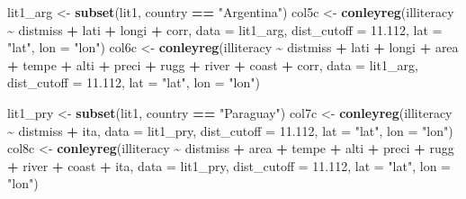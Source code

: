 \documentclass[
  a4paper,
]{article}
\newenvironment{Shaded}{\begin{snugshade}}{\end{snugshade}}
\newcommand{\AttributeTok}[1]{\textcolor[rgb]{0.13,0.29,0.53}{#1}}
\newcommand{\FloatTok}[1]{\textcolor[rgb]{0.00,0.00,0.81}{#1}}
\newcommand{\FunctionTok}[1]{\textcolor[rgb]{0.13,0.29,0.53}{\textbf{#1}}}
\newcommand{\NormalTok}[1]{#1}
\newcommand{\OtherTok}[1]{\textcolor[rgb]{0.56,0.35,0.01}{#1}}
\newcommand{\SpecialCharTok}[1]{\textcolor[rgb]{0.81,0.36,0.00}{\textbf{#1}}}
\newcommand{\StringTok}[1]{\textcolor[rgb]{0.31,0.60,0.02}{#1}}
\begin{document}
\begin{Shaded}
\begin{Highlighting}[]
\NormalTok{lit1\_arg }\OtherTok{\textless{}{-}} \FunctionTok{subset}\NormalTok{(lit1, country }\SpecialCharTok{==} \StringTok{"Argentina"}\NormalTok{)}
\NormalTok{col5c }\OtherTok{\textless{}{-}} \FunctionTok{conleyreg}\NormalTok{(illiteracy }\SpecialCharTok{\textasciitilde{}}\NormalTok{ distmiss }\SpecialCharTok{+}\NormalTok{ lati }\SpecialCharTok{+}\NormalTok{ longi }\SpecialCharTok{+}\NormalTok{ corr, }\AttributeTok{data =}\NormalTok{ lit1\_arg,}
    \AttributeTok{dist\_cutoff =} \FloatTok{11.112}\NormalTok{, }\AttributeTok{lat =} \StringTok{"lat"}\NormalTok{, }\AttributeTok{lon =} \StringTok{"lon"}\NormalTok{)}
\NormalTok{col6c }\OtherTok{\textless{}{-}} \FunctionTok{conleyreg}\NormalTok{(illiteracy }\SpecialCharTok{\textasciitilde{}}\NormalTok{ distmiss }\SpecialCharTok{+}\NormalTok{ lati }\SpecialCharTok{+}\NormalTok{ longi }\SpecialCharTok{+}\NormalTok{ area }\SpecialCharTok{+}\NormalTok{ tempe }\SpecialCharTok{+}\NormalTok{ alti }\SpecialCharTok{+}\NormalTok{ preci }\SpecialCharTok{+}
\NormalTok{    rugg }\SpecialCharTok{+}\NormalTok{ river }\SpecialCharTok{+}\NormalTok{ coast }\SpecialCharTok{+}\NormalTok{ corr, }\AttributeTok{data =}\NormalTok{ lit1\_arg, }\AttributeTok{dist\_cutoff =} \FloatTok{11.112}\NormalTok{, }\AttributeTok{lat =} \StringTok{"lat"}\NormalTok{,}
    \AttributeTok{lon =} \StringTok{"lon"}\NormalTok{)}

\NormalTok{lit1\_pry }\OtherTok{\textless{}{-}} \FunctionTok{subset}\NormalTok{(lit1, country }\SpecialCharTok{==} \StringTok{"Paraguay"}\NormalTok{)}
\NormalTok{col7c }\OtherTok{\textless{}{-}} \FunctionTok{conleyreg}\NormalTok{(illiteracy }\SpecialCharTok{\textasciitilde{}}\NormalTok{ distmiss }\SpecialCharTok{+}\NormalTok{ ita, }\AttributeTok{data =}\NormalTok{ lit1\_pry, }\AttributeTok{dist\_cutoff =} \FloatTok{11.112}\NormalTok{,}
    \AttributeTok{lat =} \StringTok{"lat"}\NormalTok{, }\AttributeTok{lon =} \StringTok{"lon"}\NormalTok{)}
\NormalTok{col8c }\OtherTok{\textless{}{-}} \FunctionTok{conleyreg}\NormalTok{(illiteracy }\SpecialCharTok{\textasciitilde{}}\NormalTok{ distmiss }\SpecialCharTok{+}\NormalTok{ area }\SpecialCharTok{+}\NormalTok{ tempe }\SpecialCharTok{+}\NormalTok{ alti }\SpecialCharTok{+}\NormalTok{ preci }\SpecialCharTok{+}\NormalTok{ rugg }\SpecialCharTok{+}\NormalTok{ river }\SpecialCharTok{+}
\NormalTok{    coast }\SpecialCharTok{+}\NormalTok{ ita, }\AttributeTok{data =}\NormalTok{ lit1\_pry, }\AttributeTok{dist\_cutoff =} \FloatTok{11.112}\NormalTok{, }\AttributeTok{lat =} \StringTok{"lat"}\NormalTok{, }\AttributeTok{lon =} \StringTok{"lon"}\NormalTok{)}
\end{Highlighting}
\end{Shaded}
\end{document}
